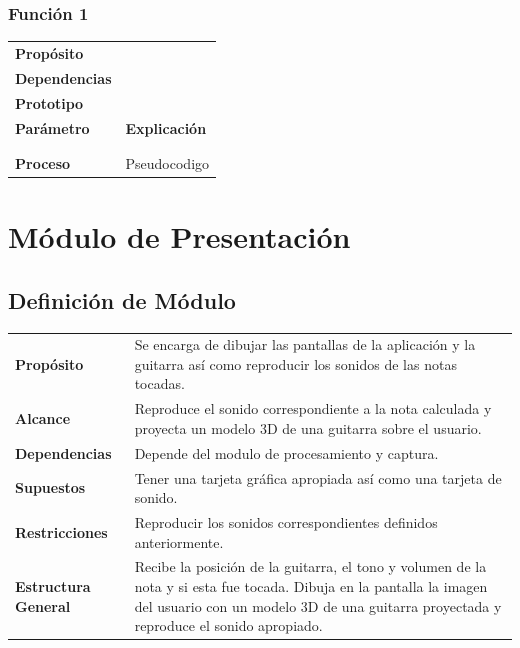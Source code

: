 \documentclass[a4paper,10pt]{article}
\begin{document}
\subsubsection{Función 1}
\begin{tabularx}{\textwidth}{p{25mm} X}
        \textbf{Propósito} & \\
        \textbf{Dependencias} & \\
        \textbf{Prototipo} & \\
        \textbf{Parámetro} & \textbf{Explicación} \\
        \begin{tabular}{p{2cm} l}
                Parámetro 1 & \\
        \end{tabular}

        \textbf{Retorno} & \\
        \textbf{Proceso} & Pseudocodigo \\
\end{tabularx}



\section{Módulo de Presentación}
\label{sec:presentacion}
\subsection{Definición de Módulo}
\begin{tabularx}{\textwidth}{p{25mm} X}
        \textbf{Propósito} & Se encarga de dibujar las pantallas de la aplicación y la guitarra así como reproducir los sonidos de las notas tocadas.\\
        \textbf{Alcance} & Reproduce el sonido correspondiente a la nota calculada y proyecta un modelo 3D de una guitarra sobre el usuario.\\
        \textbf{Dependencias} & Depende del modulo de procesamiento y captura.\\
        \textbf{Supuestos} & Tener una tarjeta gráfica apropiada así como una tarjeta de sonido.\\
        \textbf{Restricciones} & Reproducir los sonidos correspondientes definidos anteriormente.\\
        \textbf{Estructura General} & Recibe la posición de la guitarra, el
        tono y volumen de la nota y si esta fue tocada. Dibuja en la pantalla
        la imagen del usuario con un modelo 3D de una guitarra proyectada y
        reproduce el sonido apropiado.\\
\end{tabularx}
\end{document}
